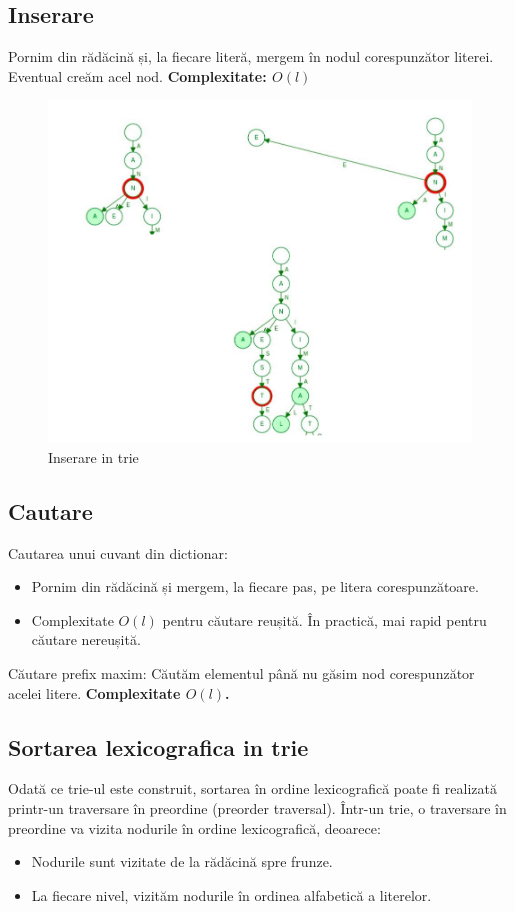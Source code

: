\documentclass[11pt,a4paper]{article}
\theoremstyle{definition}
\theoremstyle{plain}
\theoremstyle{remark}
\begin{document}
\subsection*{Inserare}
Pornim din rădăcină și, la ﬁecare literă, mergem în nodul corespunzător literei. Eventual creăm acel nod. \textbf{Complexitate: $O(l)$}

\begin{figure}[H]
    \centering
    \includegraphics[width=0.75\linewidth]{insert-trie.png}
    \caption{Inserare in trie}
    \label{fig:enter-label}
\end{figure}

\subsection*{Cautare}

Cautarea unui cuvant din dictionar: 
\begin{itemize}
    \item Pornim din rădăcină și mergem, la ﬁecare pas, pe litera corespunzătoare.
    \item Complexitate $O(l)$ pentru căutare reușită.
    În practică, mai rapid pentru căutare nereușită.
\end{itemize}

Căutare preﬁx maxim: Căutăm elementul până nu găsim nod corespunzător acelei litere. \textbf{Complexitate $O(l)$.}

\subsection*{Sortarea lexicografica in trie}
Odată ce trie-ul este construit, sortarea în ordine lexicografică poate fi realizată printr-un traversare în preordine (preorder traversal). Într-un trie, o traversare în preordine va vizita nodurile în ordine lexicografică, deoarece:

\begin{itemize}
    \item Nodurile sunt vizitate de la rădăcină spre frunze.
    \item La fiecare nivel, vizităm nodurile în ordinea alfabetică a literelor.
\end{itemize}
\end{document}

